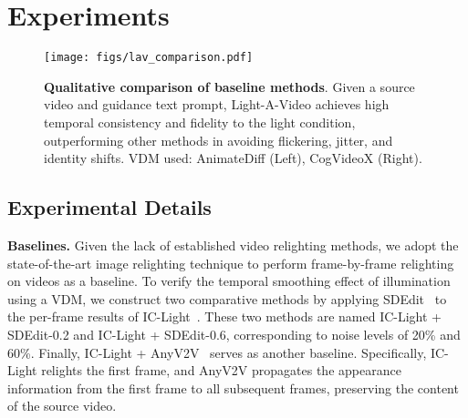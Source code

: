 \vspace{-0.5em}
\section{Experiments}
\label{sec:experiment}

\begin{figure*}[htp]
\centering
\texttt{[image: figs/lav\_comparison.pdf]}
\vspace{-2em}
\caption{\textbf{Qualitative comparison of baseline methods}.
Given a source video and guidance text prompt, 
Light-A-Video achieves high temporal consistency and fidelity to the light condition, 
outperforming other methods in avoiding flickering, jitter, and identity shifts.
VDM used: AnimateDiff (Left), CogVideoX (Right).
}
\vspace{-0.5em}
\label{fig:comparison}
\end{figure*}



\subsection{Experimental Details}
\label{sec:details}

\noindent \textbf{Baselines.} 
Given the lack of established video relighting methods, we adopt the state-of-the-art image 
relighting technique to perform frame-by-frame relighting on videos as a baseline. 
To verify the temporal smoothing effect of illumination using a VDM,
we construct two comparative methods by applying SDEdit~\citep{meng2021sdedit} to the per-frame results of IC-Light~\citep{zhang2025scaling}.
These two methods are named IC-Light + SDEdit-0.2 and IC-Light + SDEdit-0.6, 
corresponding to noise levels of 20\% and 60\%.
Finally, IC-Light + AnyV2V~\citep{ku2024anyv2v} serves as another baseline. 
Specifically, IC-Light relights the first frame, and AnyV2V propagates the appearance information
from the first frame to all subsequent frames, preserving the content of the source video.

